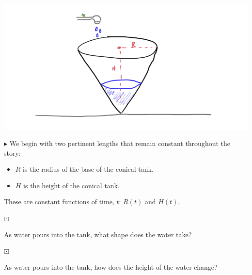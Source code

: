 \documentclass{ximera}
\begin{document}
\begin{image}
\includegraphics{pics/cone_3.png}
\end{image}






$\blacktriangleright$ We begin with two pertinent lengths that remain constant throughout the story:

\begin{itemize}
\item $R$ is the radius of the base of the conical tank.
\item $H$ is the height of the conical tank.
\end{itemize}

These are constant functions of time, $t$: $R(t)$ and $H(t)$.







\begin{question} $\boxdot$ 

As water pours into the tank, what shape does the water take?

\begin{multipleChoice}
\end{multipleChoice}

\end{question}









\begin{question} $\boxdot$ 

As water pours into the tank, how does the height of the water change?

\begin{multipleChoice}
\end{multipleChoice}

\end{question}
\end{document}
